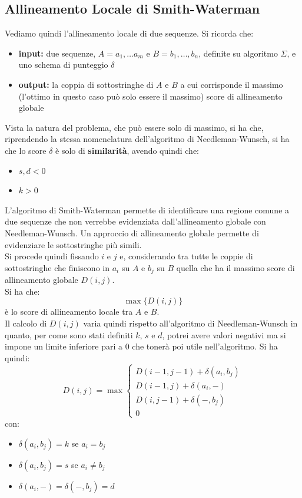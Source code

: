 \documentclass[a4paper,12pt, oneside]{book}
\begin{document}
\subsection{Allineamento Locale di Smith-Waterman}
Vediamo quindi l'allineamento locale di due sequenze. Si ricorda che:
\begin{itemize}
  \item \textbf{input:} due sequenze, $A=a_1,\ldots a_m$ e $B=b_1,\ldots,b_n$,
  definite su algoritmo $\Sigma$, e uno schema di punteggio $\delta$
  \item \textbf{output:} la coppia di sottostringhe di $A$ e $B$ a cui
  corrisponde il massimo (l'ottimo in questo caso può solo essere il massimo)
  score di allineamento globale 
\end{itemize}
Vista la natura del problema, che può essere solo di massimo, si ha che,
riprendendo la stessa nomenclatura dell'algoritmo di Needleman-Wunsch, si ha che
lo score $\delta$ è solo di \textbf{similarità}, avendo quindi che:
\begin{itemize}
  \item $s,d<0$
  \item $k>0$
\end{itemize}
L'algoritmo di Smith-Waterman permette di identificare una regione comune a due
sequenze che non verrebbe evidenziata dall'allineamento globale con
Needleman-Wunsch. Un approccio di allineamento globale permette di evidenziare
le sottostringhe più simili.\\
Si procede quindi fissando $i$ e $j$ e, considerando tra tutte le coppie di
sottostringhe che finiscono in $a_i$ su $A$ e $b_j$ su $B$ quella che ha il
massimo score di allineamento globale $D(i,j)$.\\
Si ha che:
\[\max \{D(i,j)\}\]
è lo score di allineamento locale tra $A$ e $B$.\\
Il calcolo di $D(i,j)$ varia quindi rispetto all'algoritmo di Needleman-Wunsch
in quanto, per come sono stati definiti $k$, $s$ e $d$, potrei avere valori
negativi ma si impone un limite inferiore pari a 0 che tonerà poi utile
nell'algoritmo. Si ha quindi:
\[D(i,j)=\max
  \begin{cases}
    D(i-1,j-1)+\delta(a_i,b_j)\\
    D(i-1,j)+\delta(a_i,-)\\
    D(i, j-1)+\delta(-,b_j)\\
    0
  \end{cases}
\]
con:
\begin{itemize}
  \item $\delta(a_i,b_j)=k$ se $a_i=b_j$
  \item $\delta(a_i,b_j)=s$ se $a_i\neq b_j$
  \item $\delta(a_i,-)=\delta(-,b_j)=d$
\end{itemize}
\end{document}
